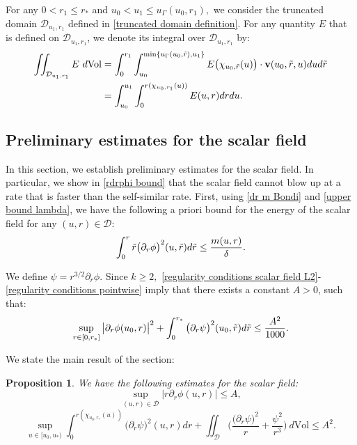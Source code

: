 \documentclass[11pt]{article}
\newtheorem{proposition}{Proposition}[section]
\numberwithin{equation}{section}
\begin{document}
For any $0<r_1\leq r_*$ and $u_0<u_1\leq u_{\Gamma}(u_0,r_1),$ we consider the truncated domain $\mathcal{D}_{u_1,r_1}$ defined in \eqref{truncated domain definition}.  For any quantity $E$ that is defined on $\mathcal{D}_{u_1,r_1}$, we denote its integral over $\mathcal{D}_{u_1,r_1}$ by:
\begin{align*}
    \iint_{\mathcal{D}_{u_1,r_1}}E\ d\mathrm{Vol}&=\int_0^{r_1}\int_{u_0}^{\min\{u_{\Gamma}(u_0,\Tilde{r}),u_1\}}E\big(\chi_{u_0,\Tilde{r}}(u)\big)\cdot\textbf{v}(u_0,\Tilde{r},u)dud\Tilde{r}\\
    &=\int_{u_0}^{u_1}\int_0^{r(\chi_{u_0,r_1}(u))}E(u,r)drdu.
\end{align*}


\subsection{Preliminary estimates for the scalar field}\label{preliminary scalar field section}
In this section, we establish preliminary estimates for the scalar field. In particular, we show in \eqref{rdrphi bound} that the scalar field cannot blow up at a rate that is faster than the self-similar rate. First, using \eqref{dr m Bondi} and \eqref{upper bound lambda}, we have the following a priori bound for the energy of the scalar field for any $(u,r)\in\mathcal{D}$:
\begin{equation}\label{preliminary bound for phi from m}
    \int_0^r\Tilde{r}\big(\partial_r\phi\big)^2(u,\Tilde{r})d\Tilde{r}\leq\frac{m(u,r)}{\delta}.
\end{equation}

We define $\psi=r^{3/2}\partial_r\phi.$ Since $k\geq2,$ \eqref{regularity conditions scalar field L2}-\eqref{regularity conditions pointwise} imply that there exists a constant $A>0$, such that:
\begin{equation}\label{assumption on initial data mass gap}
    \sup_{r\in[0,r_*]}\big|\partial_r\phi(u_0,r)\big|^2+\int_0^{r_*}\big(\partial_r\psi\big)^2(u_0,\Tilde{r})d\Tilde{r}\leq\frac{A^2}{1000}.
\end{equation}

We state the main result of the section:
\begin{proposition}\label{preliminary scalar field proposition}
     We have the following estimates for the scalar field:
    \begin{equation}\label{rdrphi bound}
        \sup_{(u,r)\in\mathcal{D}}\big|r\partial_r\phi(u,r)\big|\leq A,
    \end{equation}
    \begin{equation}\label{preliminary energy estimate psi}
        \sup_{u\in[u_0,u_*)}\int_0^{r(\chi_{u_0,r_*}(u))}\big(\partial_r\psi\big)^2(u,r)dr+\iint_{\mathcal{D}}\bigg(\frac{\big(\partial_r\psi\big)^2}{r}+\frac{\psi^2}{r^3}\bigg)\ d\mathrm{Vol}\leq A^2.
    \end{equation}
\end{proposition}
\end{document}
